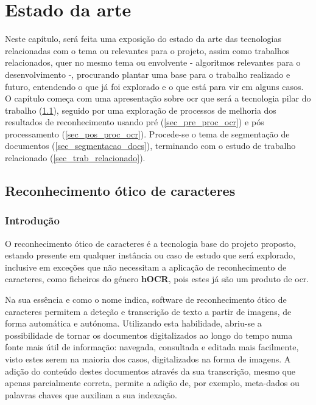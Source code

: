 \chapter{Estado da arte}
\label{cap_estado_arte}

Neste capítulo, será feita uma exposição do estado da arte das tecnologias relacionadas com o tema ou relevantes para o projeto, assim como trabalhos relacionados, quer no mesmo tema ou envolvente - algoritmos relevantes para o desenvolvimento -, procurando plantar uma base para o trabalho realizado e futuro, entendendo o que já foi explorado e o que está para vir em alguns casos.
O capítulo começa com uma apresentação sobre \acrshort{ocr} que será a tecnologia pilar do trabalho (\ref{sec_ocr}), seguido por uma exploração de processos de melhoria dos resultados de reconhecimento usando pré (\ref{sec_pre_proc_ocr}) e pós processamento (\ref{sec_pos_proc_ocr}). Procede-se o tema de segmentação de documentos (\ref{sec_segmentacao_docs}), terminando com o estudo de trabalho relacionado (\ref{sec_trab_relacionado}).



\section{Reconhecimento ótico de caracteres}
\label{sec_ocr}


\subsection{Introdução}

O reconhecimento ótico de caracteres é a tecnologia base do projeto proposto, estando presente em qualquer instância ou caso de estudo que será explorado, inclusive em exceções que não necessitam a aplicação de reconhecimento de caracteres, como ficheiros do género \textbf{hOCR},  pois estes já são um produto de \acrshort{ocr}.

Na sua essência e como o nome indica, software de reconhecimento ótico de caracteres permitem a deteção e transcrição de texto a partir de imagens, de forma automática e autónoma. Utilizando esta habilidade, abriu-se a possibilidade de tornar os documentos digitalizados ao longo do tempo numa fonte mais útil de informação: navegada, consultada e editada mais facilmente, visto estes serem na maioria dos casos, digitalizados na forma de imagens. A adição do conteúdo destes documentos através da sua transcrição, mesmo que apenas parcialmente correta, permite a adição de, por exemplo, meta-dados ou palavras chaves que auxiliam a sua indexação. 




